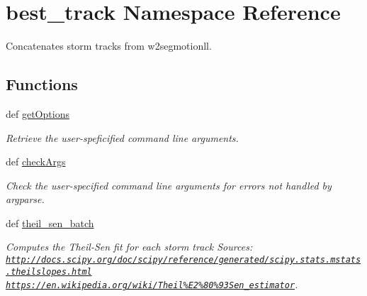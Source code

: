 \hypertarget{namespacebest__track}{\section{best\-\_\-track Namespace Reference}
\label{namespacebest__track}
}


Concatenates storm tracks from w2segmotionll.  


\subsection*{Functions}
\begin{DoxyCompactItemize}
\item 
\hypertarget{namespacebest__track_a09088a9013df27853bf9f485f05f0a72}{def \hyperlink{namespacebest__track_a09088a9013df27853bf9f485f05f0a72}{get\-Options}}\label{namespacebest__track_a09088a9013df27853bf9f485f05f0a72}

\begin{DoxyCompactList}\small\item\em Retrieve the user-\/speficified command line arguments. \end{DoxyCompactList}\item 
def \hyperlink{namespacebest__track_a6b44d523a11a359018dc76509518b179}{check\-Args}
\begin{DoxyCompactList}\small\item\em Check the user-\/specified command line arguments for errors not handled by argparse. \end{DoxyCompactList}\item 
def \hyperlink{namespacebest__track_ae3b3ae8d6c815814fe4c07f614024a4a}{theil\-\_\-sen\-\_\-batch}
\begin{DoxyCompactList}\small\item\em Computes the Theil-\/\-Sen fit for each storm track Sources\-: \href{http://docs.scipy.org/doc/scipy/reference/generated/scipy.stats.mstats.theilslopes.html}{\tt http\-://docs.\-scipy.\-org/doc/scipy/reference/generated/scipy.\-stats.\-mstats.\-theilslopes.\-html} \href{https://en.wikipedia.org/wiki/Theil%E2%80%93Sen_estimator}{\tt https\-://en.\-wikipedia.\-org/wiki/\-Theil\%\-E2\%80\%93\-Sen\-\_\-estimator}. \end{DoxyCompactList}\end{DoxyCompactItemize}
